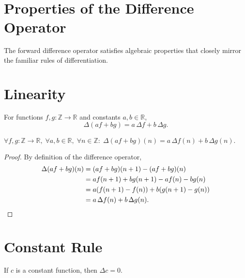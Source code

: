 
\section{Properties of the Difference Operator}
\label{subsec:difference-operator-properties}

The forward difference operator satisfies algebraic properties that
closely mirror the familiar rules of differentiation.

\section*{Linearity}

\begin{proposition}
\label{prop:delta-linearity}
For functions \(f,g : \mathbb{Z} \to \mathbb{R}\) and constants \(a,b \in \mathbb{R}\),
\[
\Delta (a f + b g)
=
a\,\Delta f + b\,\Delta g.
\]
\end{proposition}

\begin{remark*}
\(\forall f,g : \mathbb{Z}\to\mathbb{R},\;
\forall a,b \in \mathbb{R},\;
\forall n \in \mathbb{Z}:\;
\Delta(af+bg)(n) = a\,\Delta f(n) + b\,\Delta g(n)\).
\end{remark*}

\begin{proof}
By definition of the difference operator,
\[
\begin{aligned}
\Delta (a f + b g)(n)
&= (a f + b g)(n+1) - (a f + b g)(n) \\
&= a f(n+1) + b g(n+1) - a f(n) - b g(n) \\
&= a(f(n+1)-f(n)) + b(g(n+1)-g(n)) \\
&= a\,\Delta f(n) + b\,\Delta g(n). \qedhere
\end{aligned}
\]
\end{proof}

\section*{Constant Rule}

\begin{proposition}
\label{prop:delta-constant}
If \(c\) is a constant function, then \(\Delta c = 0\).
\end{proposition}

